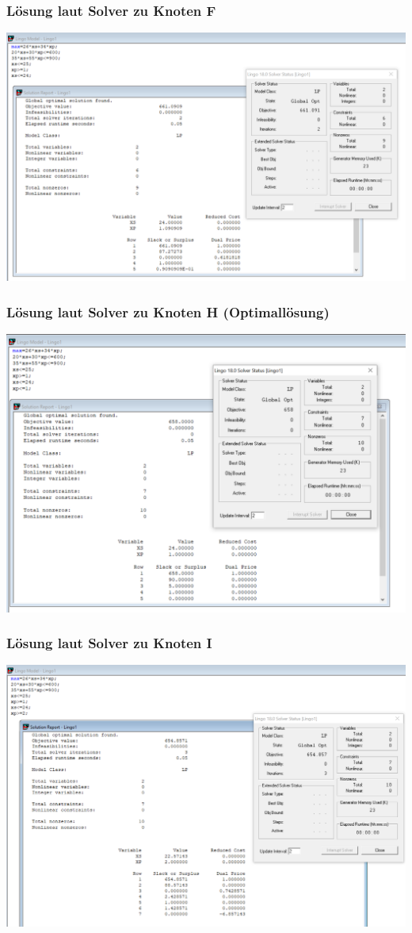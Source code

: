 \documentclass[a4paper,11pt]{article}
\begin{document}
\subsubsection*{Lösung laut Solver zu Knoten F}
\begin{centering}
	\includegraphics[width=0.65\linewidth]{src/blatt_5_aufgabe_2_teilaufgabe_b_knoten_f_loesung_solver.png}
\end{centering}

\subsubsection*{Lösung laut Solver zu Knoten H (Optimallösung)}
\begin{centering}
	\includegraphics[width=0.65\linewidth]{src/blatt_5_aufgabe_2_teilaufgabe_b_knoten_h_loesung_solver.png}
\end{centering}

\subsubsection*{Lösung laut Solver zu Knoten I}
\begin{centering}
	\includegraphics[width=0.65\linewidth]{src/blatt_5_aufgabe_2_teilaufgabe_b_knoten_i_loesung_solver.png}
\end{centering}
\end{document}
